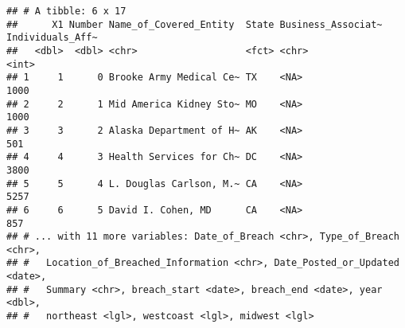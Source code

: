 \documentclass[
]{article}
\newenvironment{Shaded}{\begin{snugshade}}{\end{snugshade}}
\newcommand{\CommentTok}[1]{\textcolor[rgb]{0.56,0.35,0.01}{\textit{#1}}}
\newcommand{\ConstantTok}[1]{\textcolor[rgb]{0.00,0.00,0.00}{#1}}
\newcommand{\ControlFlowTok}[1]{\textcolor[rgb]{0.13,0.29,0.53}{\textbf{#1}}}
\newcommand{\FunctionTok}[1]{\textcolor[rgb]{0.00,0.00,0.00}{#1}}
\newcommand{\NormalTok}[1]{#1}
\newcommand{\OtherTok}[1]{\textcolor[rgb]{0.56,0.35,0.01}{#1}}
\newcommand{\SpecialCharTok}[1]{\textcolor[rgb]{0.00,0.00,0.00}{#1}}
\newcommand{\StringTok}[1]{\textcolor[rgb]{0.31,0.60,0.02}{#1}}
\begin{document}
\begin{Shaded}
\end{Shaded}

\begin{verbatim}
## # A tibble: 6 x 17
##      X1 Number Name_of_Covered_Entity  State Business_Associat~ Individuals_Aff~
##   <dbl>  <dbl> <chr>                   <fct> <chr>                         <int>
## 1     1      0 Brooke Army Medical Ce~ TX    <NA>                           1000
## 2     2      1 Mid America Kidney Sto~ MO    <NA>                           1000
## 3     3      2 Alaska Department of H~ AK    <NA>                            501
## 4     4      3 Health Services for Ch~ DC    <NA>                           3800
## 5     5      4 L. Douglas Carlson, M.~ CA    <NA>                           5257
## 6     6      5 David I. Cohen, MD      CA    <NA>                            857
## # ... with 11 more variables: Date_of_Breach <chr>, Type_of_Breach <chr>,
## #   Location_of_Breached_Information <chr>, Date_Posted_or_Updated <date>,
## #   Summary <chr>, breach_start <date>, breach_end <date>, year <dbl>,
## #   northeast <lgl>, westcoast <lgl>, midwest <lgl>
\end{verbatim}
\end{document}
